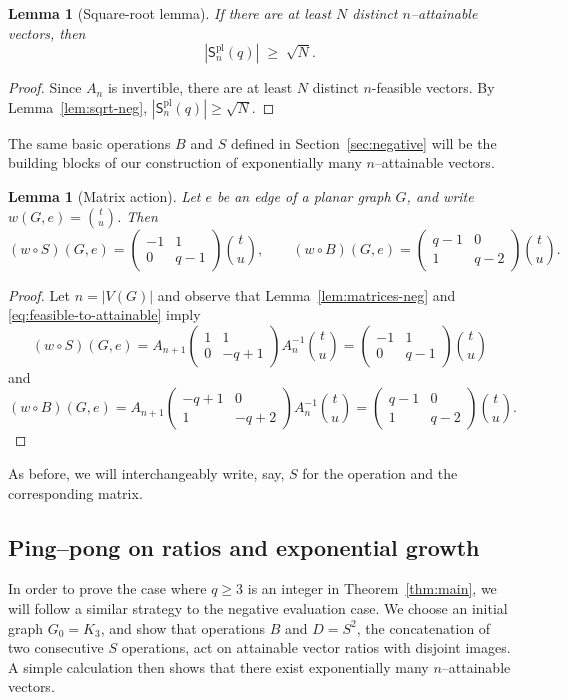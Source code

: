 \documentclass[A4paper,reqno,oneside,12pt]{amsart}
\theoremstyle{plain}
\newtheorem{lemma}[theorem]{Lemma}
\theoremstyle{definition}
\DeclareMathOperator{\pl}{\mathrm{pl}}
\begin{document}
\begin{lemma}[Square-root lemma]\label{lem:sqrt-pos}
If there are at least $N$ distinct $n$--attainable vectors, then
\[
|\mathsf{S}^{\pl}_n(q)| \;\ge\; \sqrt{N}.
\]
\end{lemma}
\begin{proof}
    Since $A_n$ is invertible, there are at least $N$ distinct $n$-feasible vectors. By Lemma~\ref{lem:sqrt-neg}, $|\mathsf{S}^{\pl}_n(q)| \ge \sqrt{N}.$
\end{proof}
The same basic operations $B$ and $S$ defined in Section~\ref{sec:negative} will be the building blocks of our construction of exponentially many $n$--attainable vectors. 
\begin{lemma}[Matrix action]\label{lem:matrices-pos}
Let $e$ be an edge of a planar graph $G$, and write $w(G,e)=\binom{t}{u}$.
Then
\[
(w\circ S)(G,e)
=
\begin{pmatrix}
-1 & 1\\
0 & q-1
\end{pmatrix}
\binom{t}{u},
\qquad
(w\circ B)(G,e)
=
\begin{pmatrix}
q-1 & 0\\
1 & q-2
\end{pmatrix}
\binom{t}{u}.
\]
\end{lemma}
\begin{proof} Let $n = |V(G)|$ and observe that Lemma~\ref{lem:matrices-neg} and \eqref{eq:feasible-to-attainable} imply
    \[(w\circ S)(G,e)
=A_{n+1}\begin{pmatrix}
1 & 1\\
0 & -q+1
\end{pmatrix}A_n^{-1}
\binom{t}{u} = \begin{pmatrix}
-1 & 1\\
0 & q-1
\end{pmatrix}
\binom{t}{u}\]
and 
\[(w\circ B)(G,e)
=A_{n+1}\begin{pmatrix}
-q+1 & 0\\
1 & -q+2
\end{pmatrix}A_n^{-1}
\binom{t}{u} = \begin{pmatrix}
q-1 & 0\\
1 & q-2
\end{pmatrix}
\binom{t}{u}. \] 

\end{proof}

As before, we will interchangeably write, say, $S$ for the operation and the corresponding matrix. 

\subsection{Ping--pong on ratios and exponential growth}
In order to prove the case where $q\ge 3$ is an integer in Theorem~\ref{thm:main}, we will follow a similar strategy to the negative evaluation case. We choose an initial graph $G_0=K_3$, and show that operations $B$ and $D=S^2$, the concatenation of two consecutive $S$ operations, act on attainable vector ratios with disjoint images. A simple calculation then shows that there exist exponentially many $n$--attainable vectors.
\end{document}

